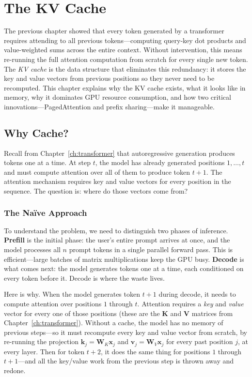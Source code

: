 \chapter{The KV Cache}
\label{ch:kvcache}

The previous chapter showed that every token generated by a transformer requires attending to all previous tokens---computing query-key dot products and value-weighted sums across the entire context. Without intervention, this means re-running the full attention computation from scratch for every single new token. The \emph{KV cache} is the data structure that eliminates this redundancy: it stores the key and value vectors from previous positions so they never need to be recomputed. This chapter explains why the KV cache exists, what it looks like in memory, why it dominates GPU resource consumption, and how two critical innovations---PagedAttention and prefix sharing---make it manageable.

\section{Why Cache?}
\label{sec:kvcache:why}

%
Recall from Chapter~\ref{ch:transformer} that autoregressive generation produces tokens one at a time. At step $t$, the model has already generated positions $1, \ldots, t$ and must compute attention over all of them to produce token $t+1$. The attention mechanism requires key and value vectors for every position in the sequence. The question is: where do those vectors come from?

\subsection{The Na\"ive Approach}

To understand the problem, we need to distinguish two phases of inference. \textbf{Prefill} is the initial phase: the user's entire prompt arrives at once, and the model processes all $n$ prompt tokens in a single parallel forward pass. This is efficient---large batches of matrix multiplications keep the GPU busy. \textbf{Decode} is what comes next: the model generates tokens one at a time, each conditioned on every token before it. Decode is where the waste lives.

Here is why. When the model generates token $t+1$ during decode, it needs to compute attention over positions $1$ through $t$. Attention requires a \emph{key} and \emph{value} vector for every one of those positions (these are the $\mathbf{K}$ and $\mathbf{V}$ matrices from Chapter~\ref{ch:transformer}). Without a cache, the model has no memory of previous steps---so it must recompute every key and value vector from scratch, by re-running the projection $\mathbf{k}_j = \mathbf{W}_K \mathbf{x}_j$ and $\mathbf{v}_j = \mathbf{W}_V \mathbf{x}_j$ for every past position $j$, at every layer. Then for token $t+2$, it does the same thing for positions $1$ through $t+1$---and all the key/value work from the previous step is thrown away and redone.

